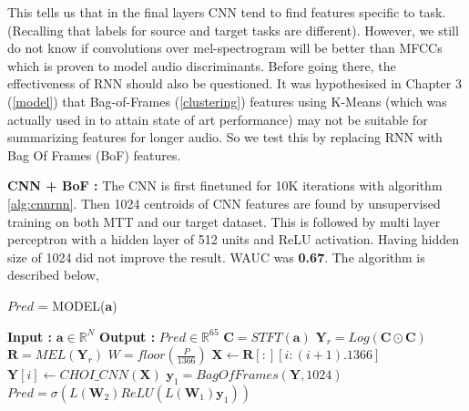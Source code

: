 \noindent This tells us that in the final layers CNN tend to find features specific to task. (Recalling that labels for source and target tasks are different). However, we still do not know if convolutions over mel-spectrogram will be better than MFCCs which is proven to model audio discriminants. Before going there, the effectiveness of RNN should also be questioned. It was hypothesised in Chapter 3 (\ref{model}) that Bag-of-Frames (\ref{clustering}) features using K-Means (which was actually used in \cite{MultiScale} to attain state of art performance) may not be suitable for summarizing features for longer audio. So we test this by replacing RNN with Bag Of Frames (BoF) features.
\bigskip

\noindent \textbf{CNN + BoF :}
The CNN is first finetuned for 10K iterations with algorithm \ref{alg:cnnrnn}. Then 1024 centroids of CNN features are found by unsupervised training on both MTT and our target dataset. This is followed by multi layer perceptron with a hidden layer of 512 units and ReLU activation. Having hidden size of 1024 did not improve the result. WAUC was \textbf{0.67}. The algorithm is described below,

\begin{algorithm}
  \caption{$Pred$ = MODEL($\textbf{a}$) }\label{alg:cnnbow}
  \begin{algorithmic}[1]
    \Statex \textbf{Input :} $\textbf{a} \in \mathbb{R}^{N}$
    \Statex \textbf{Output :} $Pred \in \mathbb{R}^{65}$ 
    \State $\textbf{C} = STFT(\textbf{a})$ 
    \State $\textbf{Y}_{r} = Log(\textbf{C} \odot \textbf{C})$ 
    \State $\textbf{R} = MEL(\textbf{Y}_{r})$ 
    \State $W = floor(\frac{P}{1366})$
      \State $\textbf{X} \leftarrow \textbf{R}[:][i:(i+1).1366]$ 
      \State $\textbf{Y}[i] \leftarrow CHOI\_CNN(\textbf{X})$  
    \EndFor
    \State $\textbf{y}_{1} = BagOfFrames(\textbf{Y},1024)$ 
     \State $Pred = \sigma(L(\textbf{W}_{2})ReLU(L(\textbf{W}_{1})\textbf{y}_{1}))$ 
  \end{algorithmic}
\end{algorithm}
\FloatBarrier
    
